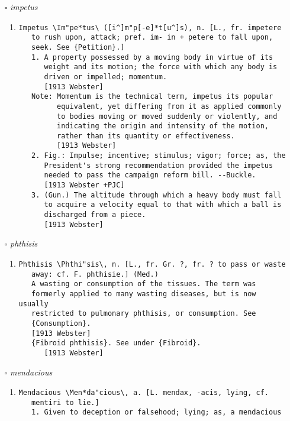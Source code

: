 \documentclass{article}
\begin{document}
\begin{itemize}
\begin{enumerate}
{\begin{lstlisting}
\end{lstlisting}}
\end{enumerate}
\item[$\square$] \emph{ impetus }
\begin{enumerate}
\item{
\begin{lstlisting}
Impetus \Im"pe*tus\ ([i^]m"p[-e]*t[u^]s), n. [L., fr. impetere
   to rush upon, attack; pref. im- in + petere to fall upon,
   seek. See {Petition}.]
   1. A property possessed by a moving body in virtue of its
      weight and its motion; the force with which any body is
      driven or impelled; momentum.
      [1913 Webster]
   Note: Momentum is the technical term, impetus its popular
         equivalent, yet differing from it as applied commonly
         to bodies moving or moved suddenly or violently, and
         indicating the origin and intensity of the motion,
         rather than its quantity or effectiveness.
         [1913 Webster]
   2. Fig.: Impulse; incentive; stimulus; vigor; force; as, the
      President's strong recommendation provided the impetus
      needed to pass the campaign reform bill. --Buckle.
      [1913 Webster +PJC]
   3. (Gun.) The altitude through which a heavy body must fall
      to acquire a velocity equal to that with which a ball is
      discharged from a piece.
      [1913 Webster]
\end{lstlisting}}
\end{enumerate}
\item[$\square$] \emph{ phthisis }
\begin{enumerate}
\item{
\begin{lstlisting}
Phthisis \Phthi"sis\, n. [L., fr. Gr. ?, fr. ? to pass or waste
   away: cf. F. phthisie.] (Med.)
   A wasting or consumption of the tissues. The term was
   formerly applied to many wasting diseases, but is now usually
   restricted to pulmonary phthisis, or consumption. See
   {Consumption}.
   [1913 Webster]
   {Fibroid phthisis}. See under {Fibroid}.
      [1913 Webster]
\end{lstlisting}}
\end{enumerate}
\item[$\square$] \emph{ mendacious }
\begin{enumerate}
\item{
\begin{lstlisting}
Mendacious \Men*da"cious\, a. [L. mendax, -acis, lying, cf.
   mentiri to lie.]
   1. Given to deception or falsehood; lying; as, a mendacious

\end{lstlisting}}
\end{enumerate}
\end{itemize}
\end{document}
